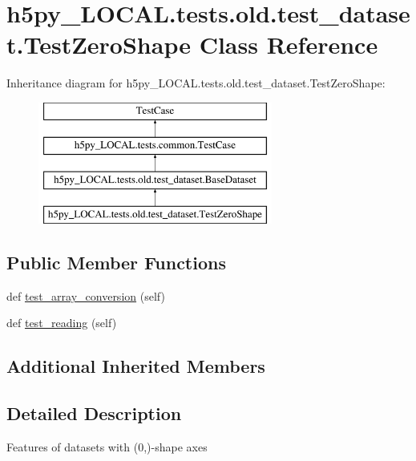 \hypertarget{classh5py__LOCAL_1_1tests_1_1old_1_1test__dataset_1_1TestZeroShape}{}\section{h5py\+\_\+\+L\+O\+C\+A\+L.\+tests.\+old.\+test\+\_\+dataset.\+Test\+Zero\+Shape Class Reference}
\label{classh5py__LOCAL_1_1tests_1_1old_1_1test__dataset_1_1TestZeroShape}
Inheritance diagram for h5py\+\_\+\+L\+O\+C\+A\+L.\+tests.\+old.\+test\+\_\+dataset.\+Test\+Zero\+Shape\+:\begin{figure}[H]
\begin{center}
\leavevmode
\includegraphics[height=4.000000cm]{classh5py__LOCAL_1_1tests_1_1old_1_1test__dataset_1_1TestZeroShape}
\end{center}
\end{figure}
\subsection*{Public Member Functions}
\begin{DoxyCompactItemize}
\item 
def \hyperlink{classh5py__LOCAL_1_1tests_1_1old_1_1test__dataset_1_1TestZeroShape_a778c832dbe17154f1ea5b18186ec4383}{test\+\_\+array\+\_\+conversion} (self)
\item 
def \hyperlink{classh5py__LOCAL_1_1tests_1_1old_1_1test__dataset_1_1TestZeroShape_af71d96a2559329c120e5ec438d569271}{test\+\_\+reading} (self)
\end{DoxyCompactItemize}
\subsection*{Additional Inherited Members}


\subsection{Detailed Description}
\begin{DoxyVerb}    Features of datasets with (0,)-shape axes
\end{DoxyVerb}
 

